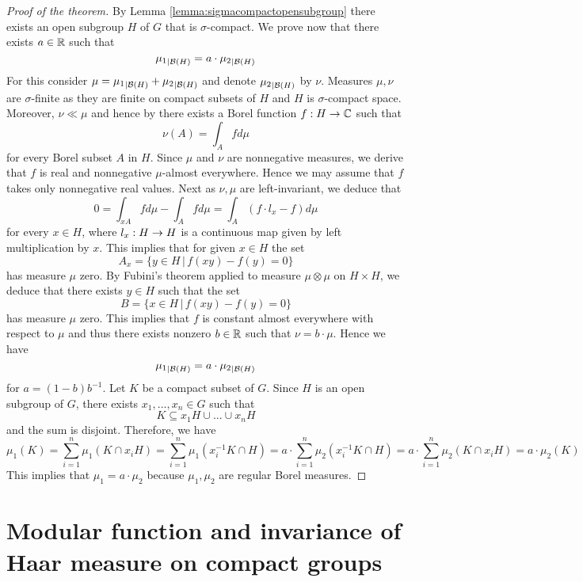 \begin{proof}[Proof of the theorem]
By Lemma \ref{lemma:sigmacompactopensubgroup} there exists an open subgroup $H$ of $G$ that is $\sigma$-compact. We prove now that there exists $a\in {\mathbb R}$ such that
$${\mu_1}_{\mid {\mathcal B}(H)} = a\cdot {\mu_2}_{\mid {\mathcal B}(H)}$$
For this consider $\mu = {\mu_1}_{\mid {\mathcal B}(H)} + {\mu_2}_{\mid {\mathcal B}(H)}$ and denote ${\mu_2}_{\mid {\mathcal B}(H)}$ by $\nu$. Measures $\mu, \nu$ are $\sigma$-finite as they are finite on compact subsets of $H$ and $H$ is $\sigma$-compact space. Moreover, $\nu \ll \mu$ and hence by {\cite[Theorem 5.3]{RadonNikodym}} there exists a Borel function $f:H\rightarrow {\mathbb C}$ such that
$$\nu(A) = \int_Afd\mu$$
for every Borel subset $A$ in $H$. Since $\mu$ and $\nu$ are nonnegative measures, we derive that $f$ is real and nonnegative $\mu$-almost everywhere. Hence we may assume that $f$ takes only nonnegative real values. Next as $\nu, \mu$ are left-invariant, we deduce that
$$0 = \int_{xA}fd\mu -\int_Afd\mu = \int_A\left(f\cdot l_x - f\right)d\mu$$
for every $x\in H$, where $l_x:H\rightarrow H$ is a continuous map given by left multiplication by $x$. This implies that for given $x\in H$ the set
$$A_x = \big\{y\in H\,\big|\,f(xy) - f(y) = 0\big\}$$
has measure $\mu$ zero. By Fubini's theorem applied to measure $\mu\otimes \mu$ on $H\times H$, we deduce that there exists $y\in H$ such that the set
$$B = \big\{x\in H\,\big|\,f(xy) -f(y) = 0\big\}$$
has measure $\mu$ zero. This implies that $f$ is constant almost everywhere with respect to $\mu$ and thus there exists nonzero $b\in {\mathbb R}$ such that $\nu = b\cdot \mu$. Hence we have
$${\mu_1}_{\mid {\mathcal B}(H)} = a\cdot {\mu_2}_{\mid {\mathcal B}(H)}$$
for $a = (1-b)b^{-1}$. Let $K$ be a compact subset of $G$. Since $H$ is an open subgroup of $G$, there exists $x_1,...,x_n\in G$ such that
$$K\subseteq x_1H\cup ...\cup x_nH$$
and the sum is disjoint. Therefore, we have
$$\mu_1(K) = \sum_{i=1}^n\mu_1\left(K\cap x_iH\right) = \sum_{i=1}^n\mu_1\left(x_i^{-1}K\cap H\right) =a\cdot \sum_{i=1}^n\mu_2\left(x_i^{-1}K\cap H\right) = a\cdot \sum_{i=1}^n\mu_2\left(K\cap x_iH\right) = a\cdot \mu_2(K)$$
This implies that $\mu_1 = a\cdot \mu_2$ because $\mu_1,\mu_2$ are regular Borel measures.
\end{proof}

\section{Modular function and invariance of Haar measure on compact groups}






\small



